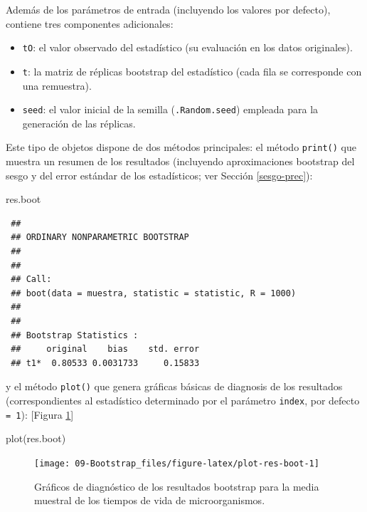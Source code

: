 \documentclass[
  10pt,
]{book}
\newenvironment{Shaded}{\begin{snugshade}}{\end{snugshade}}
\newcommand{\FunctionTok}[1]{\textcolor[rgb]{0.00,0.00,0.00}{#1}}
\newcommand{\NormalTok}[1]{#1}
\theoremstyle{break}
\theoremstyle{nonumberplain}
\begin{document}
Además de los parámetros de entrada (incluyendo los valores por defecto), contiene tres componentes adicionales:

\begin{itemize}
\item
  \texttt{tO}: el valor observado del estadístico
  (su evaluación en los datos originales).
\item
  \texttt{t}: la matriz de réplicas bootstrap del estadístico
  (cada fila se corresponde con una remuestra).
\item
  \texttt{seed}: el valor inicial de la semilla (\texttt{.Random.seed})
  empleada para la generación de las réplicas.
\end{itemize}

Este tipo de objetos dispone de dos métodos principales:
el método \texttt{print()} que muestra un resumen de los resultados
(incluyendo aproximaciones bootstrap del sesgo y del error
estándar de los estadísticos; ver Sección \ref{sesgo-prec}):

\begin{Shaded}
\begin{Highlighting}[]
\NormalTok{res.boot}
\end{Highlighting}
\end{Shaded}

\begin{verbatim}
 ## 
 ## ORDINARY NONPARAMETRIC BOOTSTRAP
 ## 
 ## 
 ## Call:
 ## boot(data = muestra, statistic = statistic, R = 1000)
 ## 
 ## 
 ## Bootstrap Statistics :
 ##     original    bias    std. error
 ## t1*  0.80533 0.0031733     0.15833
\end{verbatim}

y el método \texttt{plot()} que genera gráficas básicas de diagnosis
de los resultados (correspondientes al estadístico determinado por el parámetro \texttt{index}, por defecto \texttt{=\ 1}): {[}Figura \ref{fig:plot-res-boot}{]}

\begin{Shaded}
\begin{Highlighting}[]
\FunctionTok{plot}\NormalTok{(res.boot)}
\end{Highlighting}
\end{Shaded}

\begin{figure}[!htbp]

{\centering \texttt{[image: 09-Bootstrap\_files/figure-latex/plot-res-boot-1]} 

}

\caption{Gráficos de diagnóstico de los resultados bootstrap para la media muestral de los tiempos de vida de microorganismos.}\label{fig:plot-res-boot}
\end{figure}
\end{document}
